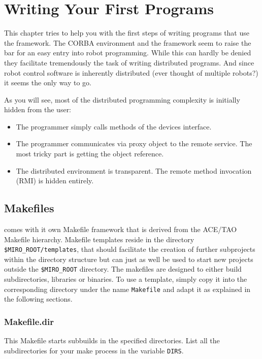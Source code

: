 \chapter{Writing Your First Programs}

This chapter tries to help you with the first steps of writing
programs that use the \miro framework. The CORBA environment and the
\miro framework seem to raise the bar for an easy entry into robot
programming. While this can hardly be denied they facilitate
tremendously the task of writing distributed programs. And since robot
control software is inherently distributed (ever thought of multiple
robots?) it seems the only way to go.

As you will see, most of the distributed programming complexity is
initially hidden from the user:

\begin{itemize}
\item The programmer simply calls methods of the devices interface.
\item The programmer communicates via proxy object to the remote
  service. The most tricky part is getting the object reference.
\item The distributed environment is transparent. The
  remote method invocation (RMI) is hidden entirely.
\end{itemize}


\section{Makefiles}
\label{sec:makefile}

\miro comes with it own Makefile framework that is derived from the
ACE/TAO Makefile hierarchy. Makefile templates reside in the directory
{\tt \$MIRO\_ROOT/templates}, that should facilitate the creation
of further subprojects within the \miro directory structure but can
just as well be used to start new projects outside the
{\tt \$MIRO\_ROOT} directory. The makefiles are designed to either
build subdirectories, libraries or binaries. To use a template, simply
copy it into the corresponding directory under the name
{\tt Makefile} and adapt it as explained in the following sections.


\subsection{Makefile.dir}

This Makefile starts subbuilds in the specified directories. List all
the subdirectories for your make process in the variable {\tt DIRS}.


